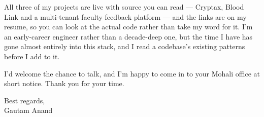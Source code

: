 \documentclass[letterpaper,11pt]{article}
\begin{document}
All three of my projects are live with source you can read --- Cryptax, Blood Link and a multi-tenant faculty feedback platform --- and the links are on my resume, so you can look at the actual code rather than take my word for it. I'm an early-career engineer rather than a decade-deep one, but the time I have has gone almost entirely into this stack, and I read a codebase's existing patterns before I add to it.

I'd welcome the chance to talk, and I'm happy to come in to your Mohali office at short notice. Thank you for your time.

\vspace{6pt}

Best regards, \\
Gautam Anand
\end{document}
